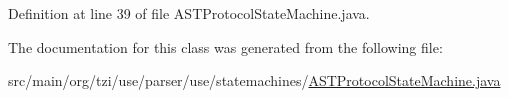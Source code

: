 Definition at line 39 of file A\-S\-T\-Protocol\-State\-Machine.\-java.



The documentation for this class was generated from the following file\-:\begin{DoxyCompactItemize}
\item 
src/main/org/tzi/use/parser/use/statemachines/\hyperlink{_a_s_t_protocol_state_machine_8java}{A\-S\-T\-Protocol\-State\-Machine.\-java}\end{DoxyCompactItemize}
